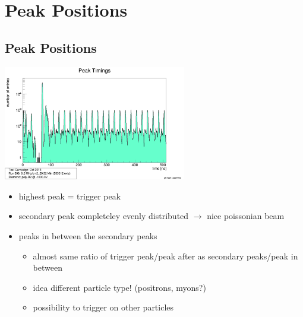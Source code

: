 \documentclass[9pt]{beamer}
\begin{document}
\section{Peak Positions}
\subsection{Peak Positions}
\begin{frame}
	\begin{center}
		\includegraphics[width=8cm]{PeakTimings}
	\end{center}
	\begin{itemize}
		\item highest peak = trigger peak
		\item secondary peak completeley evenly distributed $\rightarrow$ nice poissonian beam
		\item peaks in between the secondary peaks
		\begin{itemize}
			\item almost same ratio of trigger peak/peak after as secondary peaks/peak in between
			\item idea different particle type! (positrons, myons?)
			\item possibility to trigger on other particles
		\end{itemize}
	\end{itemize}
\end{frame}
\end{document}
